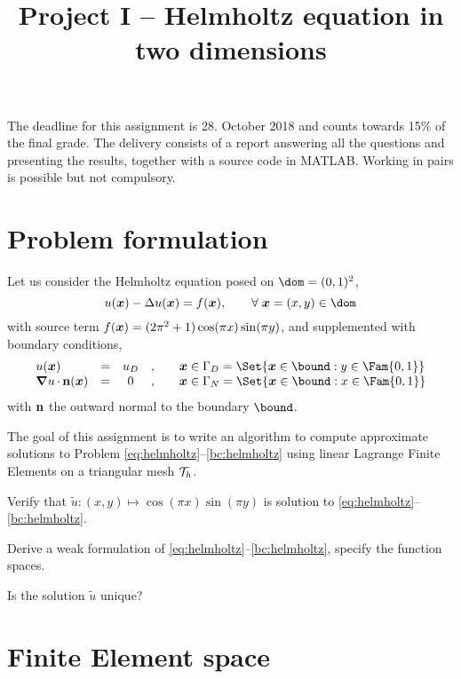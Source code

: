 \documentclass[assignment]{tmanotes}
\title{Project I -- Helmholtz equation in two dimensions}
\date{}
\begin{document}
\maketitle

The deadline for this assignment is 28. October 2018 and counts towards 15\% of the final grade.
The delivery consists of a report answering all the questions and presenting the results, together with a source code in MATLAB.
Working in pairs is possible but not compulsory.

\section{Problem formulation}

Let us consider the Helmholtz equation posed on $\dom = (0,1)^2$,
\begin{equation}\label{eq:helmholtz}
u(\xx) - \Delta u(\xx) = f(\xx), \qquad \forany \xx = (x,y)\in\dom
\end{equation}
with source term $f({{\boldsymbol x}}) = (2\pi^2 + 1)\cos(\pi x)\sin(\pi y)$, and supplemented with boundary conditions,
\begin{equation}\label{bc:helmholtz}
\begin{array}{lcccl}
u(\xx)              &=& u_D &,&\quad \xx\in\Gamma_D = \Set{\xx\in\bound : y \in \Fam{0,1}}\\
\Grad u\xDot\n(\xx) &=& 0   &,&\quad \xx\in\Gamma_N = \Set{\xx\in\bound : x \in \Fam{0,1}}\\
\end{array}
\end{equation}
with $\mathbf n$ the outward normal to the boundary $\bound$.

\medskip
The goal of this assignment is to write an algorithm to compute approximate solutions to Problem \eqref{eq:helmholtz}--\eqref{bc:helmholtz} using linear Lagrange Finite Elements on a triangular mesh ${\mathcal T}_h$.

\medskip
\begin{tmatsks}
\item Verify that $\tilde u: (x,y) \mapsto \cos(\pi x)\sin(\pi y)$ is solution to \eqref{eq:helmholtz}--\eqref{bc:helmholtz}.
\item Derive a weak formulation of \eqref{eq:helmholtz}--\eqref{bc:helmholtz}, specify the function spaces.
\item Is the solution $\tilde u$ unique?
\end{tmatsks}

\section{Finite Element space}
\end{document}
